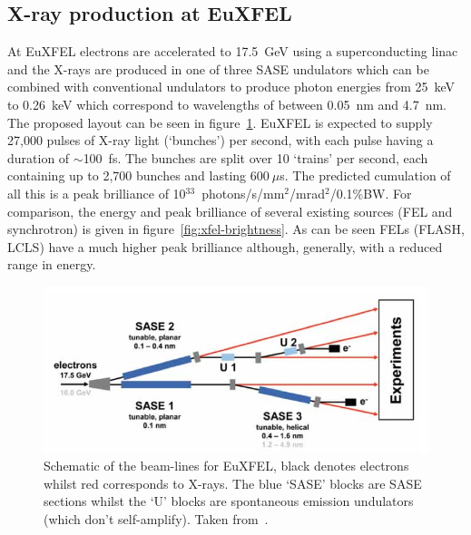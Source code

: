\subsection{X-ray production at EuXFEL} %
\label{sub:x_ray_production_at_euxfel}
At EuXFEL electrons are accelerated to 17.5~GeV using a superconducting linac and the X-rays are produced in one of three SASE undulators which can be combined with conventional undulators to produce photon energies from 25~keV to 0.26~keV which correspond to wavelengths of between 0.05~nm and 4.7~nm. The proposed layout can be seen in figure~\ref{fig:XFEL_layout}. EuXFEL is expected to supply 27,000 pulses of X-ray light (`bunches') per second, with each pulse having a duration of \( \sim \)100~fs. The bunches are split over 10 `trains' per second, each containing up to 2,700 bunches and lasting \( 600~\mu\)s. The predicted cumulation of all this is a peak brilliance of 10\(^{33}\)~photons/s/mm\(^2\)/mrad\(^2\)/0.1\%BW. For comparison, the energy and peak brilliance of several existing sources (FEL and synchrotron) is given in figure~\ref{fig:xfel-brightness}. As can be seen FELs (FLASH, LCLS) have a much higher peak brilliance although, generally, with a reduced range in energy.
\begin{figure}[htbp]
  \centering
    \includegraphics[width=.9\textwidth]{images/Other/XFEL_layout.png}
  \caption{Schematic of the beam-lines for EuXFEL, black denotes electrons whilst red corresponds to X-rays. The blue `SASE' blocks are SASE sections whilst the `U' blocks are spontaneous emission undulators (which don't self-amplify). Taken from~\cite{xfel_tdr}.}
  \label{fig:XFEL_layout}
\end{figure}

